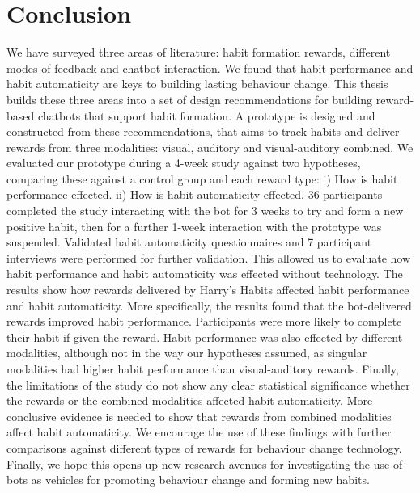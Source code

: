 \section{Conclusion}
We have surveyed three areas of literature: habit formation rewards, different modes of feedback and chatbot interaction. We found that habit performance and habit automaticity are keys to building lasting behaviour change. This thesis builds these three areas into a set of design recommendations for building reward-based chatbots that support habit formation.
A prototype is designed and constructed from these recommendations, that aims to track habits and deliver rewards from three modalities: visual, auditory and visual-auditory combined.
We evaluated our prototype during a 4-week study against two hypotheses, comparing these against a control group and each reward type: i) How is habit performance effected. ii) How is habit automaticity effected. 36 participants completed the study interacting with the bot for 3 weeks to try and form a new positive habit, then for a further 1-week interaction with the prototype was suspended. Validated habit automaticity questionnaires and 7 participant interviews were performed for further validation. This allowed us to evaluate how habit performance and habit automaticity was effected without technology. The results show how rewards delivered by Harry's Habits affected habit performance and habit automaticity. More specifically, the results found that the bot-delivered rewards improved habit performance. Participants were more likely to complete their habit if given the reward. Habit performance was also effected by different modalities, although not in the way our hypotheses assumed, as singular modalities had higher habit performance than visual-auditory rewards. Finally, the limitations of the study do not show any clear statistical significance whether the rewards or the combined modalities affected habit automaticity. More conclusive evidence is needed to show that rewards from combined modalities affect habit automaticity. We encourage the use of these findings with further comparisons against different types of rewards for behaviour change technology. Finally, we hope this opens up new research avenues for investigating the use of bots as vehicles for promoting behaviour change and forming new habits.
